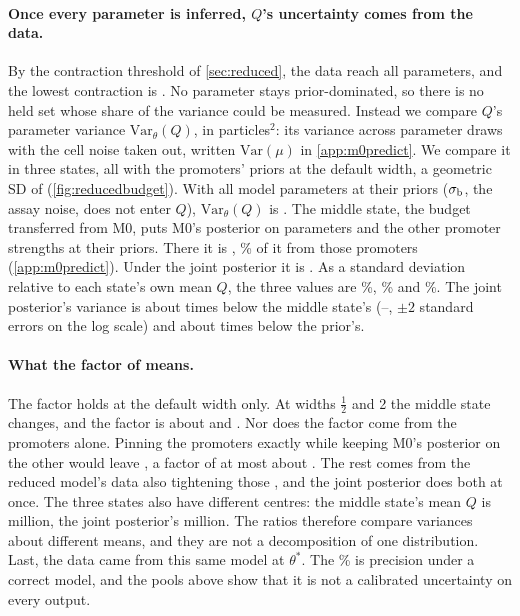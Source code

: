 \paragraph{Once every parameter is inferred, $Q$'s uncertainty comes from the data.} By the
contraction threshold of \cref{sec:reduced}, the data reach all  parameters,
and the lowest contraction is . No parameter stays prior-dominated, so there is no held set
whose share of the variance could be measured. Instead we compare $Q$'s parameter variance
$\mathrm{Var}_\theta(Q)$, in particles$^2$: its variance across parameter draws with the cell
noise taken out, written $\mathrm{Var}(\mu)$ in \cref{app:m0predict}. We compare it in three
states, all with the promoters' priors at the default width, a geometric SD of
 (\cref{fig:reducedbudget}). With all  model parameters at
their priors ($\sigma_{\mathrm{b}}$, the assay noise, does not enter $Q$), $\mathrm{Var}_\theta(Q)$ is . The middle state, the budget transferred from M0, puts M0's
posterior on  parameters and the  other promoter strengths at their
priors. There it is , \% of it from those promoters
(\cref{app:m0predict}). Under the joint posterior it is . As a standard
deviation relative to each state's own mean $Q$, the three values are \%,
\% and \%. The joint
posterior's variance is about  times below the middle state's
(--, $\pm 2$ standard errors on the log scale) and about
 times below the prior's.

\paragraph{What the factor of  means.} The factor holds at the default width
only. At widths $\tfrac12$ and 2 the middle state changes, and the factor is about
 and . Nor does the factor come from the promoters alone. Pinning the  promoters exactly while
keeping M0's posterior on the other  would leave , a factor of
at most about . The rest comes from the reduced model's data also tightening those
, and the joint posterior does both at once. The three states also have different
centres: the middle state's mean $Q$ is  million, the joint posterior's
 million. The ratios therefore compare variances about different means,
and they are not a decomposition of one distribution. Last, the data came from this same model at
$\theta^\ast$. The \% is precision under a correct model, and the pools above
show that it is not a calibrated uncertainty on every output.

